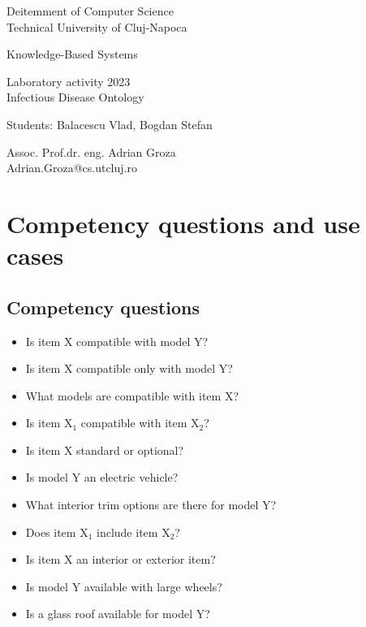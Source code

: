 \documentclass[a4paper,12pt]{report}
\begin{document}
\newcommand{\h}{\texttt}

\vspace{-5cm}
\begin{center}
Deitemment of Computer Science\\
Technical University of Cluj-Napoca\\
\end{center}
\vspace{1cm}
\begin{center}
\begin{Large}
Knowledge-Based Systems\\
\end{Large}

\vspace*{1cm}
Laboratory activity 2023\\

\vspace*{1cm}
Infectious Disease Ontology \\
\vspace*{1cm}

Students: Balacescu Vlad, Bogdan Stefan\\

\vspace*{14cm}

Assoc. Prof.dr. eng. Adrian Groza\\
Adrian.Groza@cs.utcluj.ro
\end{center}

\newpage 
\tableofcontents

\chapter{Competency questions and use cases}
\section{Competency questions}

\begin{itemize}
  \item Is item X compatible with model Y?
  \item Is item X compatible only with model Y?
  \item What models are compatible with item X?
  \item Is item X$_1$ compatible with item X$_2$?
  \item Is item X standard or optional?
  \item Is model Y an electric vehicle?
  \item What interior trim options are there for model Y?
  \item Does item X$_1$ include item X$_2$?
  \item Is item X an interior or exterior item?
  \item Is model Y available with large wheels?
  \item Is a glass roof available for model Y?
\end{itemize}
\end{document}
